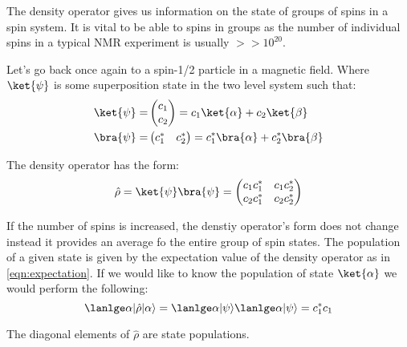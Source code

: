 The density operator gives us information on the state of groups of spins in a spin system. It is
vital to be able to spins in groups as the number of individual spins in a typical NMR experiment is
usually $>>10^20$.

Let's go back once again to a spin-1/2 particle in a magnetic field. Where $\ket{\psi}$ is some superposition state in the two level system such that:
\begin{equation}
\begin{align}
\ket{\psi} =& \begin{pmatrix}
    c_1\\
    c_2
\end{pmatrix} = c_1\ket{\alpha} + c_2\ket{\beta}\\
\bra{\psi} =& \begin{pmatrix}
  c_1^* & c_2^*
\end{pmatrix} = c_1^*\bra{\alpha} + c_2^*\bra{\beta}
\end{align}
\end{equation}

The density operator has the form:
\begin{equation}
  \hat\rho = \ket{\psi}\bra{\psi} = \begin{pmatrix}
    c_1c_1^* & c_1c_2^*\\
    c_2c_1^* & c_2c_2^*
\end{pmatrix}
\end{equation}

If the number of spins is increased, the denstiy operator's form does not change instead it provides
an average fo the entire group of spin states. The population of a given state is given by the expectation value of the density operator as in \ref{eqn:expectation}. If we would like to know
the population of state $\ket{\alpha}$ we would perform the following:
\begin{equation}
  \lanlge\alpha\vert\hat\rho\vert\alpha\rangle = \lanlge\alpha\vert\psi\rangle \lanlge\alpha\vert\psi\rangle = c_1^*c_1
\end{equation}

The diagonal elements of $\hat\rho$ are state populations.

